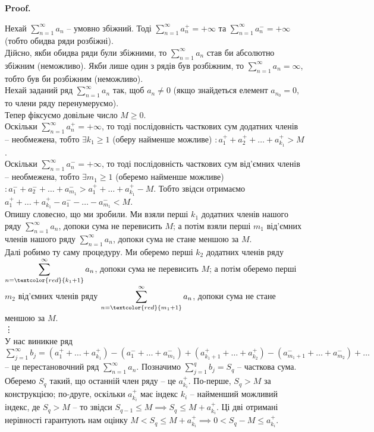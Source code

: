 \documentclass[a4paper, 10pt]{article}
\makeatletter
\theoremstyle{theoremdd}
\theoremstyle{theoremdd}
\theoremstyle{theoremdd}
\theoremstyle{theoremdd}
\theoremstyle{theoremdd}
\theoremstyle{theoremdd}
\theoremstyle{theoremdd}
\theoremstyle{theoremdd}
\theoremstyle{theoremdd}
\renewenvironment{proof}[1][Proof.\\]{\par
\pushQED{\hfill \qed}%
\normalfont \topsep6\p@\@plus6\p@\relax
\trivlist
\item\relax
{\bfseries
#1\@addpunct{.}}\hspace\labelsep\ignorespaces
}{%
\popQED\endtrivlist\@endpefalse
}
\makeatother
\begin{document}
\begin{proof}
Нехай $\displaystyle\sum_{n=1}^\infty a_n$ -- умовно збіжний. Тоді $\displaystyle\sum_{n=1}^\infty a_n^+ = +\infty$ та $\displaystyle\sum_{n=1}^\infty a_n^- = +\infty$ (тобто обидва ряди розбіжні).\\
Дійсно, якби обидва ряди були збіжними, то $\displaystyle\sum_{n=1}^\infty a_n$ став би абсолютно збіжним (неможливо). Якби лише один з рядів був розбіжним, то $\displaystyle\sum_{n=1}^\infty a_n = \infty$, тобто був би розбіжним (неможливо).\\
Нехай заданий ряд $\displaystyle\sum_{n=1}^\infty a_n$ так, щоб $a_n \neq 0$ (якщо знайдеться елемент $a_{n_0} = 0$, то члени ряду перенумеруємо).
\bigskip \\
Тепер фіксуємо довільне число $M \geq 0$.\\
Оскільки $\displaystyle\sum_{n=1}^\infty a_n^+ = +\infty$, то тоді послідовність часткових сум додатних членів -- необмежена, тобто $\exists k_1 \geq 1$ (оберу найменше можливе) $: a_1^+ + a_2^+ + \dots + a_{k_1}^+ > M$.\\
Оскільки $\displaystyle\sum_{n=1}^\infty a_n^- = +\infty$, то тоді послідовність часткових сум від'ємних членів -- необмежена, тобто $\exists m_1 \geq 1$ (оберемо найменше можливе) $: a_1^- + a_2^- + \dots + a_{m_1}^- > a_1^+ + \dots + a_{k_1}^+ - M$. Тобто звідси отримаємо $a_1^+ + \dots + a_{k_1}^+ - a_1^{-} - \dots - a_{m_1}^- < M$.\\
Опишу словесно, що ми зробили. Ми взяли перші $k_1$ додатних членів нашого ряду $\displaystyle\sum_{n=1}^\infty a_n$, допоки сума не перевисить $M$; а потім взяли перші $m_1$ від'ємних членів нашого ряду $\displaystyle\sum_{n=1}^\infty a_n$, допоки сума не стане меншою за $M$.\\
Далі робимо ту саму процедуру. Ми оберемо перші $k_2$ додатних членів ряду $\displaystyle\sum_{n=\textcolor{red}{k_1+1}}^\infty a_n$, допоки сума не перевисить $M$; а потім оберемо перші $m_2$ від'ємних членів ряду $\displaystyle\sum_{n=\textcolor{red}{m_1+1}}^\infty a_n$, допоки сума не стане меншою за $M$.\\
\vdots \\
У нас виникне ряд $\displaystyle\sum_{j=1}^\infty b_j = (a_1^+ + \dots + a_{k_1}^+) - (a_1^{-} + \dots + a_{m_1}^-) + (a_{k_1+1}^+ + \dots + a_{k_2}^+) - (a_{m_1+1}^{-} + \dots + a_{m_2}^-) + \dots$ -- це перестановочний ряд $\displaystyle\sum_{n=1}^\infty a_n$. Позначимо $\displaystyle\sum_{j=1}^q b_j = S_q$ -- часткова сума. \\
Оберемо $S_q$ такий, що останній член ряду -- це $a_{k_i}^+$. По-перше, $S_q > M$ за конструкцією; по-друге, оскільки $a_{k_i}^+$ має індекс $k_i$ -- найменший можливий індекс, де $S_q > M$ -- то звідси $S_{q-1} \leq M \implies S_q \leq M + a_{k_i}^+$. Ці дві отримані нерівності гарантують нам оцінку $M < S_q \leq M + a_{k_i}^+ \implies 0 < S_q - M \leq a_{k_i}^+$.\\

\end{proof}
\end{document}
